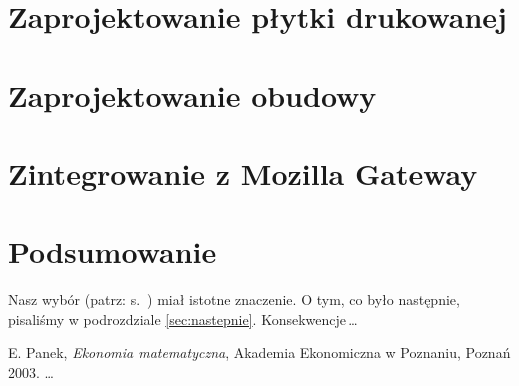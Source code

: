 \documentclass[11pt,a4paper]{report}
\begin{document}
 \chapter{Zaprojektowanie płytki drukowanej}
 
 \chapter{Zaprojektowanie obudowy}
 
 \chapter{Zintegrowanie z Mozilla Gateway}
 
 

 \chapter*{Podsumowanie}

 Nasz wybór (patrz: s.~\pageref{sec:wybor}) miał istotne znaczenie.
 O tym, co było następnie, pisaliśmy w podrozdziale \ref{sec:nastepnie}.
 Konsekwencje\,\ldots

 \begin{thebibliography}{9}
 E. Panek, \emph{Ekonomia matematyczna}, Akademia Ekonomiczna w Poznaniu,
 Poznań 2003.
 \ldots
 \end{thebibliography}

 
\end{document}
